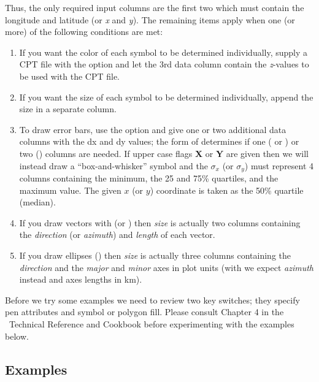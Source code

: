 \documentclass[11pt]{report}
\begin{document}
Thus, the only required input columns are the first two which must contain the
longitude and latitude (or \emph{x} and \emph{y}).  The remaining items
apply when one (or more) of the following conditions are met:

\begin{enumerate}

\item If you want the color of each symbol to be determined individually,
supply a CPT file with the  option and let the 3rd data column
contain the \emph{z}-values to be used with the CPT file.

\item If you want the size of each symbol to be determined individually,
append the size in a separate column.

\item To draw error bars, use the  option and give one or two
additional data columns with the \PM dx and \PM dy values; the form of
 determines if one ( or ) or two ()
columns are needed.  If upper case flags \textbf{X} or \textbf{Y} are given then
we will instead draw a ``box-and-whisker'' symbol and the $\sigma_x$ (or
$\sigma_y$) must represent 4 columns containing the minimum, the 25 and 75\%
quartiles, and the maximum value.  The given $x$ (or $y$) coordinate is taken as the 50\%
quartile (median).

\item If you draw vectors with  (or ) then \emph{size} is
actually two columns containing the \emph{direction} (or \emph{azimuth})
and \emph{length} of each vector.

\item If you draw ellipses () then \emph{size} is actually three
columns containing the \emph{direction} and the \emph{major} and \emph{minor}
axes in plot units (with  we expect \emph{azimuth} instead and axes
lengths in km).

\end{enumerate}

Before we try some examples we need to review two key switches; they
specify pen attributes and symbol or polygon fill.  Please consult
Chapter 4 in the \GMT\ Technical Reference and Cookbook before experimenting
with the examples below.

\subsection{Examples}
\end{document}
